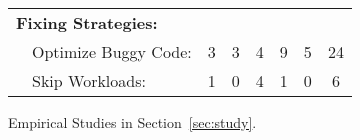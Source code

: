 \begin{table}[tb!]
\begin{adjustwidth}{-.5in}{-.5in}
{{\begin{tabular}{|lcccccc|}
\multicolumn{7}{|l|}{\bf Fixing Strategies:}\\
\ \ {{Optimize Buggy Code:}}              								&  3        &    3       &   4    &    9         &   5      &  24 \\
\ \ {Skip Workloads:}              									&  1        &    0       &   4    &    1         &   0      &   6\\
\hline
\end{tabular}
}
}
\end{adjustwidth}
\vspace{0.1in}
{Empirical Studies in Section~\ref{sec:study}.}
{}
\end{table}
